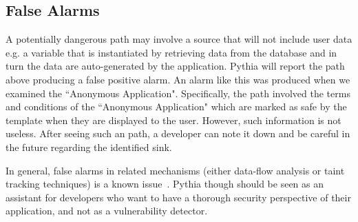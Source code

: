 \subsection{False Alarms}
\label{sc:fa}

A potentially dangerous path
may involve a source that will
not include user data
e.g. a variable that is instantiated
by retrieving data from the database
and in turn the data are auto-generated
by the application.
Pythia will report the path above
producing a false positive alarm.
An alarm like this was produced
when we examined the
``Anonymous Application".
Specifically,
the path involved the terms and
conditions of the
``Anonymous Application"
which are marked as safe by
the template when they are
displayed to the user.
However,
such information is not useless.
After seeing such an path,
a developer can note it down and
be careful in the future regarding the
identified sink.

In general,
false alarms in related mechanisms
(either data-flow analysis or
taint tracking techniques)
is a known issue~\cite{ME07, MLPK17}.
Pythia though should be seen
as an assistant for developers
who want to have a thorough
security perspective
of their application,
and not as a vulnerability detector.
